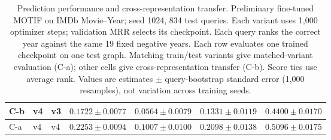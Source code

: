 \begin{table}[htbp]
\begin{adjustbox}{max width=\linewidth}
\begin{tabular}{|l|l|l|l|l|l|l|}
\hline
C-b & v4 & v3 & $0.1722 \pm 0.0077$ & $0.0564 \pm 0.0079$ & $0.1331 \pm 0.0119$ & $0.4400 \pm 0.0170$ \\
\hline
C-a & v4 & v4 & $0.2253 \pm 0.0094$ & $0.1007 \pm 0.0100$ & $0.2098 \pm 0.0138$ & $0.5096 \pm 0.0175$ \\
\hline
\end{tabular}
\end{adjustbox}
\caption{Prediction performance and cross-representation transfer. Preliminary fine-tuned MOTIF on IMDb Movie--Year; seed 1024, 834 test queries. Each variant uses 1,000 optimizer steps; validation MRR selects its checkpoint. Each query ranks the correct year against the same 19 fixed negative years. Each row evaluates one trained checkpoint on one test graph. Matching train/test variants give matched-variant evaluation (C-a); other cells give cross-representation transfer (C-b). Score ties use average rank. Values are estimates $\pm$ query-bootstrap standard error (1,000 resamples), not variation across training seeds.}
\label{tab:motif-imdb-movie-year-matrix-transfer-performance}
\end{table}

